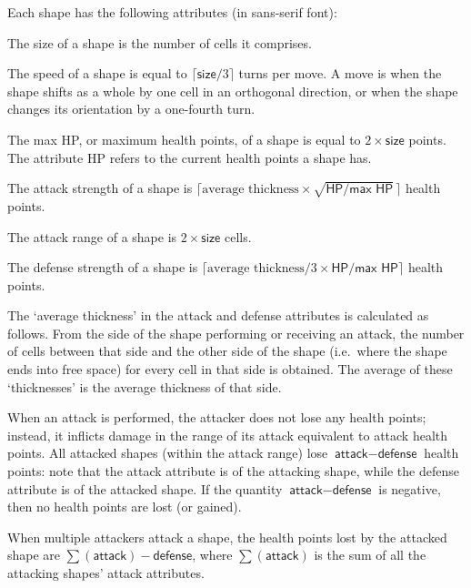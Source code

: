 \documentclass[a4paper,11pt]{article}
\begin{document}
Each shape has the following attributes (in \textsf{sans-serif} font):
\begin{description}
\addtolength{\itemsep}{-4pt}
    \item[\textsf{size}] The \textsf{size} of a shape is the number of cells it comprises.
    \item[\textsf{speed}] The \textsf{speed} of a shape is equal to \(\lceil \textsf{size}/3 \rceil\) turns per move. A move is when the shape shifts as a whole by one cell in an orthogonal direction, or when the shape changes its orientation by a one-fourth turn.
    \item[\textsf{max HP} and \textsf{HP}] The \textsf{max HP}, or maximum health points, of a shape is equal to \(2 \times \textsf{size}\) points. The attribute \textsf{HP} refers to the current health points a shape has.
    \item[\textsf{attack}] The \textsf{attack} strength of a shape is \(\big\lceil \text{average thickness} \times \sqrt{\textsf{HP}/\textsf{max HP}}\, \big\rceil\) health points.
    \item[\textsf{attack range}] The \textsf{attack range} of a shape is \(2 \times \textsf{size}\) cells.
    \item[\textsf{defense}] The \textsf{defense} strength of a shape is \(\lceil \text{average thickness}/3 \times \textsf{HP}/\textsf{max HP} \rceil\) health points.
\end{description}

The `average thickness' in the \textsf{attack} and \textsf{defense} attributes is calculated as follows. From the side of the shape performing or receiving an attack, the number of cells between that side and the other side of the shape (i.e.\ where the shape ends into free space) for every cell in that side is obtained. The average of these `thicknesses' is the average thickness of that side.

When an attack is performed, the attacker does not lose any health points; instead, it inflicts damage in the range of its attack equivalent to \textsf{attack} health points. All attacked shapes (within the \textsf{attack range}) lose \(\textsf{attack} - \textsf{defense}\) health points: note that the \textsf{attack} attribute is of the attacking shape, while the \textsf{defense} attribute is of the attacked shape. If the quantity \(\textsf{attack} - \textsf{defense}\) is negative, then no health points are lost (or gained).

When multiple attackers attack a shape, the health points lost by the attacked shape are \(\sum (\textsf{attack}) - \textsf{defense}\), where \(\sum (\textsf{attack})\) is the sum of all the attacking shapes' \textsf{attack} attributes.
\end{document}
